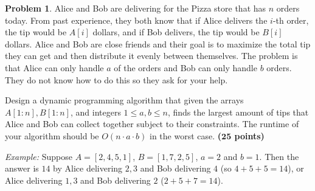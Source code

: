 \documentclass{article}
\theoremstyle{definition}
\newtheorem{problem}{Problem}
\newcommand{\grade}[1]{\hfill{\textbf{($\mathbf{#1}$ points)}}}
\begin{document}
\smallskip

\begin{problem}\label{DP}
	Alice and Bob are delivering for the Pizza store that has $n$ orders today. From past experience, they both know that if Alice delivers the $i$-th order, the tip would be $A[i]$ dollars,
	and if Bob delivers, the tip would be $B[i]$ dollars. Alice and Bob are close friends and their goal is to maximize the total tip they can get and then distribute it evenly between themselves. The problem is that 
	Alice can only handle $a$ of the orders and Bob can only handle $b$ orders. They do not know how to do this so they ask for your help. 
	
	Design a dynamic programming algorithm that given the arrays $A[1:n],B[1:n]$, and integers $1 \leq a,b \leq n$, finds the largest amount of tips that Alice and Bob can collect together subject to their constraints. The 
	runtime of your algorithm should be $O(n \cdot a \cdot b)$ in the worst case. \grade{25}
	
	\emph{Example:} Suppose $A = [2,4,5,1]$, $B=[1,7,2,5]$, $a=2$ and $b=1$. Then the answer is $14$ by Alice delivering $2,3$ and Bob delivering $4$ (so $4+5+5 = 14$), or Alice delivering $1,3$ and Bob delivering $2$ ($2+5+7=14$).  
\end{problem}

\smallskip
\end{document}
